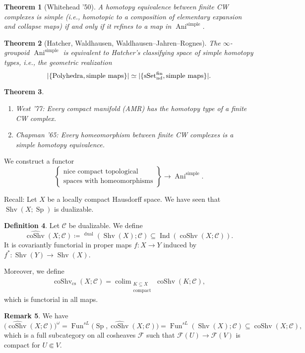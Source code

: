 \documentclass[draft]{amsart}
\newcommand{\ul}[1]{\underline{#1}}
\newcommand{\wh}[1]{\widehat{#1}}
\newcommand{\cat}[1]{\mathcal{#1}}
\newcommand{\sheaf}[1]{\mathcal{#1}}
\DeclareMathOperator{\Anima}{Ani}
\DeclareMathOperator{\coShv}{coShv}
\DeclareMathOperator{\Ind}{Ind}
\DeclareMathOperator{\Shv}{Shv}
\DeclareMathOperator{\Sp}{Sp}
\DeclareMathOperator{\Fun}{Fun}
\DeclareMathOperator{\iHom}{\ul{Hom}}
\DeclareMathOperator*{\colim}{colim}
\newtheorem{thm}{Theorem}[section]
\theoremstyle{definition}
\newtheorem{defn}[thm]{Definition}
\newtheorem{rem}[thm]{Remark}
\begin{document}
\begin{thm}[Whitehead '50]
A homotopy equivalence between finite CW complexes is simple (i.e., homotopic to a composition of elementary expansion and collapse maps) if and only if it refines to a map in $\Anima^{\mathrm{simple}}$.
\end{thm}

\begin{thm}[Hatcher, Waldhausen, Waldhausen--Jahren--Rognes]
The $\infty$-groupoid $\Anima^{\mathrm{simple}}$ is equivalent to Hatcher's classifying space of simple homotopy types, i.e., the geometric realization
\[
\lvert \{\mathrm{Polyhedra}, \textnormal{simple maps}\}\rvert \simeq \lvert \{ \mathrm{sSet}^{\mathrm{fin}}_{\mathrm{nd}}, \textnormal{simple maps}\}\rvert.
\]
\end{thm}

\begin{thm}
\begin{enumerate}[(1)]
\item West '77: Every compact manifold (AMR) has the homotopy type of a finite CW complex.

\item Chapman '65: Every homeomorphism between finite CW complexes is a simple homotopy equivalence.
\end{enumerate}
\end{thm}

We construct a functor
\[
\begin{Bmatrix}
\text{nice compact topological} \\
\text{spaces with homeomorphisms}
\end{Bmatrix} \to \Anima^{\mathrm{simple}}.
\]

Recall: Let $X$ be a locally compact Hausdorff space. We have seen that $\Shv(X;\Sp)$ is dualizable.

\begin{defn}
Let $\cat C$ be dualizable. We define
\[
\wh{\coShv}(X;\cat C) \coloneqq \iHom^{\mathrm{dual}}(\Shv(X);\cat C) \subseteq \Ind(\coShv(X;\cat C)).
\]
It is covariantly functorial in proper maps $f\colon X\to Y$ induced by $f^*\colon \Shv(Y) \to \Shv(X)$.

Moreover, we define 
\[
\wh{\coShv}_{\mathrm{cs}}(X;\cat C) = \colim_{\substack{K\subseteq X\\ \text{compact}}} \wh{\coShv}(K;\cat C),
\]
which is functorial in all maps.
\end{defn}

\begin{rem}
We have
\[
\bigl(\wh{\coShv}(X;\cat C)\bigr)^{\omega} = \Fun^{sL}\bigl(\Sp, \wh{\coShv}(X;\cat C)\bigr) = \Fun^{sL}(\Shv(X);\cat C) \subseteq \coShv(X;\cat C),
\]
which is a full subcategory on all cosheaves $\sheaf F$ such that $\sheaf F(U)\to \sheaf F(V)$ is compact for $U\Subset V$.
\end{rem}
\end{document}
